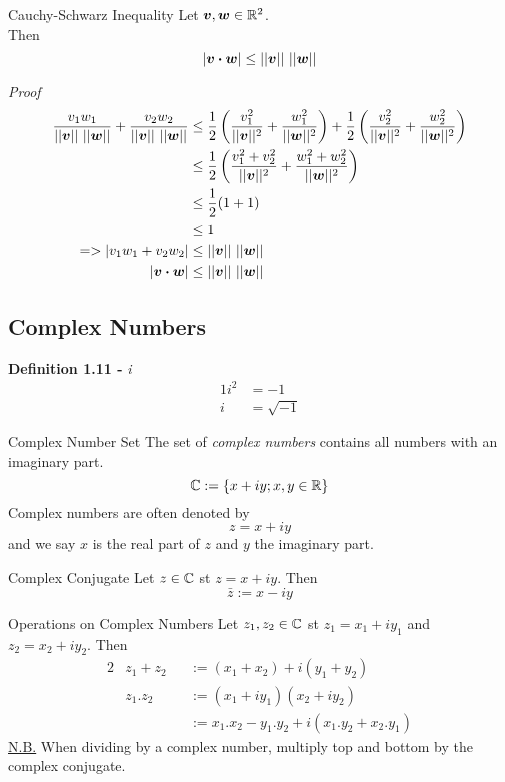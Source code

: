 \documentclass[11pt,a4paper]{article}
\begin{document}
\subtitle{Theorem 1.10 - }{Cauchy-Schwarz Inequality}
Let $\boldsymbol{v}, \boldsymbol{w} \in \mathbb{R}^2$. \\
Then $$|\boldsymbol{v} \boldsymbol{\cdot} \boldsymbol{w}| \leq ||\boldsymbol{v}||\ ||\boldsymbol{w}||$$

\textit{Proof}
\begin{align*}
  \frac{v_1w_1}{||\boldsymbol{v}||\ ||\boldsymbol{w}||} + \frac{v_2w_2}{||\boldsymbol{v}||\ ||\boldsymbol{w}||} &\leq \frac{1}{2}\left(\frac{v_{1}^{2}}{||\boldsymbol{v}||^2} + \frac{w_{1}^{2}}{||\boldsymbol{w}||^2}\right) + \frac{1}{2}\left(\frac{v_{2}^{2}}{||\boldsymbol{v}||^2} + \frac{w_{2}^{2}}{||\boldsymbol{w}||^2}\right) \\
  &\leq \frac{1}{2}\left(\frac{v_{1}^{2} + v_{2}^{2}}{||\boldsymbol{v}||^2} + \frac{w_{1}^{2} + w_{2}^{2}}{||\boldsymbol{w}||^2}\right) \\
  &\leq \frac{1}{2}(1 + 1) \\
  &\leq 1 \\
  => |v_1w_1 + v_2w_2| &\leq ||\boldsymbol{v}||\ ||\boldsymbol{w}|| \\
  |\boldsymbol{v} \boldsymbol{\cdot} \boldsymbol{w}| &\leq ||\boldsymbol{v}||\ ||\boldsymbol{w}|| \\
\end{align*}

\subsection{Complex Numbers}

\textbf{Definition 1.11 - }\textit{i}
\begin{alignat*}{1}
  i^2 &= -1 \\
  i &= \sqrt{-1}
\end{alignat*}

\subtitle{Definition 1.12 - }{Complex Number Set}
The set of \textit{complex numbers} contains all numbers with an imaginary part. $$\mathbb{C} := \left\{x + iy; x,y \in \mathbb{R}\right\}$$
Complex numbers are often denoted by $$z = x + iy$$ and we say $x$ is the real part of $z$ and $y$ the imaginary part.

\subtitle{Definition 1.13 - }{Complex Conjugate}
Let $z \in \mathbb{C}$ st $z = x + iy$. Then
$$\bar{z} := x - iy$$

\subtitle{Theorem 1.14 - }{Operations on Complex Numbers}
Let $z_1,z_2 \in \mathbb{C}$ st $z_1 = x_1 + iy_1$ and $z_2 = x_2 + iy_2$. Then
\begin{alignat*}{2}
  &z_1 + z_2 &&:= (x_1 + x_2) + i(y_1 + y_2) \\
  &z_1.z_2 &&:= (x_1 + iy_1)(x_2 + iy_2) \\
  & && := x_1.x_2 - y_1.y_2 + i(x_1.y_2 + x_2.y_1)
\end{alignat*}
\underline{N.B.} When dividing by a complex number, multiply top and bottom by the complex conjugate. \\
\end{document}
